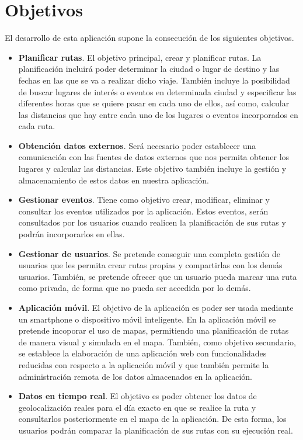 \section{Objetivos}
El desarrollo de esta aplicación supone la consecución de los siguientes objetivos.

\begin{itemize}

	\item \textbf{Planificar rutas}. El objetivo principal, crear y planificar rutas. La planificación incluirá poder determinar la ciudad o lugar de destino y las fechas en las que se va a realizar dicho viaje. También incluye la posibilidad de buscar lugares de interés o eventos en determinada ciudad y especificar las diferentes horas que se quiere pasar en cada uno de ellos, así como, calcular las distancias que hay entre cada uno de los lugares o eventos incorporados en cada ruta.
	\item \textbf{Obtención datos externos}. Será necesario poder establecer una comunicación con las fuentes de datos externos que nos permita obtener los lugares y calcular las distancias. Este objetivo también incluye la gestión y almacenamiento de estos datos en nuestra aplicación.
	\item \textbf{Gestionar eventos}. Tiene como objetivo crear, modificar, eliminar y consultar los eventos utilizados por la aplicación. Estos eventos, serán consultados por los usuarios cuando realicen la planificación de sus rutas y podrán incorporarlos en ellas.
	\item \textbf{Gestionar de usuarios}. Se pretende conseguir una completa gestión de usuarios que les permita crear rutas propias y compartirlas con los demás usuarios. También, se pretende ofrecer que un usuario pueda marcar una ruta como privada, de forma que no pueda ser accedida por lo demás.
	\item \textbf{Aplicación móvil}. El objetivo de la aplicación es poder ser usada mediante un smartphone o dispositivo móvil inteligente. En la aplicación móvil se pretende incoporar el uso de mapas, permitiendo una planificación de rutas de manera visual y simulada en el mapa. También, como objetivo secundario, se establece la elaboración de una aplicación web con funcionalidades reducidas con respecto a la aplicación móvil y que también permite la administración remota de los datos almacenados en la aplicación.
	\item \textbf{Datos en tiempo real}. El objetivo es poder obtener los datos de geolocalización reales para el día exacto en que se realice la ruta y consultarlos posteriormente en el mapa de la aplicación. De esta forma, los usuarios podrán comparar la planificación de sus rutas con su ejecución real.
	
\end{itemize}


